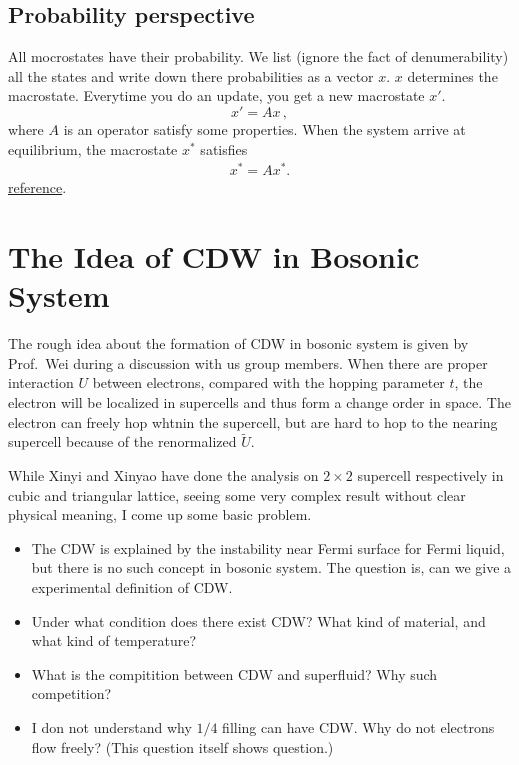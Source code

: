 \documentclass[10pt,a4paper,openany]{book}
\newcommand{\abpath}{D:/大四/科研日志/website/}
\begin{document}
\subsection{Probability perspective}
All mocrostates have their probability. We list (ignore the fact of denumerability) all the states and write down there probabilities as a vector $x$. $x$ determines the macrostate. Everytime you do an update, you get a new macrostate $x'$. 
\begin{equation}
	x' = Ax\,,
\end{equation}
where $A$ is an operator satisfy some properties. When the system arrive at equilibrium, the macrostate $x^*$ satisfies
\begin{eqnarray}
	x^*=Ax^*.
\end{eqnarray}
\href{\abpath/ref/Manousiouthakis-1999-Strict-detailed-balance-is-unnecess.pdf}{reference}.
\section{The Idea of CDW in Bosonic System}
The rough idea about the formation of CDW in bosonic system is given by Prof.\ Wei during a discussion with us group members. When there are proper interaction $U$ between electrons, compared with the hopping parameter $t$, the electron will be localized in supercells and thus form a change order in space. The electron can freely hop whtnin the supercell, but are hard to hop to the nearing supercell because of the renormalized $\widetilde{U}$.

While Xinyi and Xinyao have done the analysis on $2\times2$ supercell respectively in cubic and triangular lattice, seeing some very complex result without clear physical meaning, I come up some basic problem.

\begin{itemize}
	\item The CDW is explained by the instability near Fermi surface for Fermi liquid, but there is no such concept in bosonic system. The question is, can we give a experimental definition of CDW. 
	\item Under what condition does there exist CDW? What kind of material, and what kind of temperature?
	\item What is the compitition between CDW and superfluid? Why such competition?
	\item I don not understand why $1/4$ filling can have CDW. Why do not electrons flow freely? (This question itself shows question.)
\end{itemize}
\end{document}
